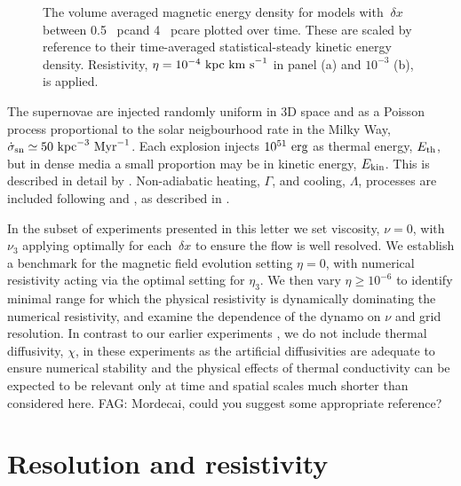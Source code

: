 \documentclass[preprint2]{aastex63}
\newcommand\SNr{\dot\sigma_{\rm sn}}
\newcommand\ESK{E_{\rm kin}}
\newcommand\EST{E_{\rm th}}
\newcommand\kpc{~ {\rm kpc}}
\newcommand\pc{~ {\rm pc}}
\newcommand\dx{~ {\delta x}}
\newcommand\Myr{~ {\rm Myr}}
\newcommand\erg{~ {\rm erg}}
\newcommand\kms{~ {\rm km~ s}^{-1}}
\newcommand{\fag}[1]{\textcolor{midgreen}{FAG: #1}}
\begin{document}
\begin{figure*}
\caption{
The volume averaged magnetic energy density for models with $\dx$
between 0.5\pc and 4\pc are plotted over time.
These are scaled by reference to their
 time-averaged statistical-steady kinetic energy density.
Resistivity, $\eta=10^{-4}\kpc\kms$ in panel {\rm(a)} and $10^{-3}$
{\rm(b)}, is applied.
\label{fig:eb-res}}
\end{figure*}

The supernovae are injected randomly uniform in 3D space and as a
Poisson process proportional to the solar neigbourhood rate in the Milky Way,
 $\SNr\simeq 50\kpc^{-3}\Myr^{-1}$. 
Each explosion injects $10^{51}\erg$ as thermal energy, $\EST$, but in 
dense media a small proportion may be in kinetic energy, $\ESK$.
This is described in detail by \citet{GMKSH20}.
Non-adiabatic heating, $\Gamma$, and cooling, $\Lambda$, processes are included
following \citet{Wolfire:1995} and \citet{Sarazin:1987}, as described in 
\citet{Gent:2013a}. 

In the subset of experiments presented in this letter we set viscosity, $\nu=0$,
with $\nu_3$ applying optimally for each $\dx$ to ensure the flow is 
well resolved.
We establish a benchmark for the magnetic field evolution setting $\eta=0$, with
numerical resistivity acting via the optimal setting for $\eta_3$.
We then vary $\eta\geq10^{-6}$ to identify minimal range for which the physical
resistivity is dynamically dominating the numerical resistivity, and examine the
dependence of the dynamo on $\nu$ and grid resolution. 
In contrast to our earlier experiments \citep{Gent:2013a,Gent:2013b,GMKSH20},
we do not include thermal diffusivity, $\chi$, in these experiments as 
the artificial diffusivities are adequate to ensure numerical stability and
the physical effects of thermal conductivity can be expected to be relevant only
at time and spatial scales much shorter than considered here.
\fag{Mordecai, could you suggest some appropriate reference?}

\section{Resolution and resistivity} \label{sec:results}
\end{document}
